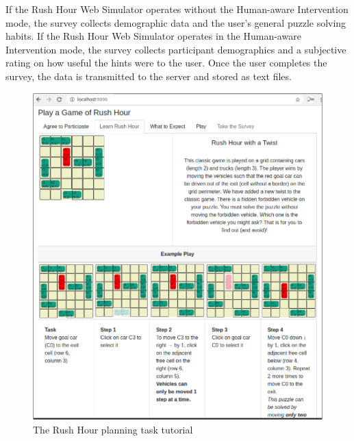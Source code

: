 If the Rush Hour Web Simulator operates without the Human-aware Intervention mode, the survey collects demographic data and the user's general puzzle solving habits.
If the Rush Hour Web Simulator operates in the Human-aware Intervention mode, the survey collects participant demographics and a subjective rating on how useful the hints were to the user.
Once the user completes the survey, the data is transmitted to the server and stored as text files.
\begin{figure}[tpb]
  \centering
\includegraphics[width=\columnwidth]{img/UI1.pdf}
  \caption{The Rush Hour planning task tutorial}
  \label{fig:ui1}
\end{figure}

